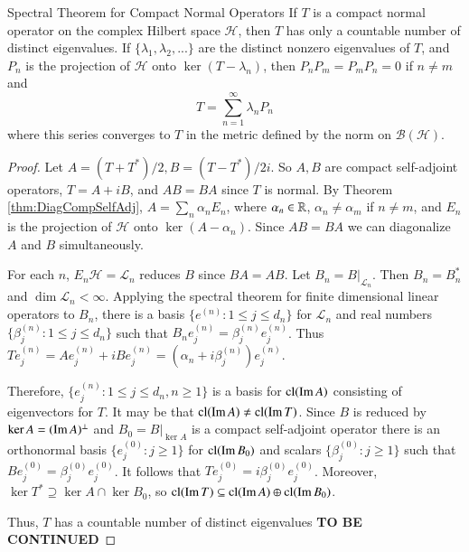 \begin{nthm}{Spectral Theorem for Compact Normal Operators}\label{thm:specComp}
    If $T$ is a compact normal operator on the complex Hilbert space $\mathscr{H}$, then $T$ has only a countable number of distinct eigenvalues. If $\{\lambda_1,\lambda_2,...\}$ are the distinct nonzero eigenvalues of $T$, and $P_n$ is the projection of $\mathscr{H}$ onto $\ker(T-\lambda_n)$, then $P_nP_m = P_mP_n = 0$ if $n \neq m$ and \begin{equation}
        T = \sum_{n=1}^{\infty}\lambda_nP_n
    \end{equation}
    where this series converges to $T$ in the metric defined by the norm on $\mathscr{B}(\mathscr{H})$.
\end{nthm}
\begin{proof}
    Let $A = (T+T^*)/2, B = (T-T^*)/2i$. So $A,B$ are compact self-adjoint operators, $T = A+iB$, and $AB=BA$ since $T$ is normal. By Theorem \ref{thm:DiagCompSelfAdj}, $A = \sum_n\alpha_nE_n$, where $\alpha_n \in \mathbb R$, $\alpha_n \neq \alpha_m$ if $n \neq m$, and $E_n$ is the projection of $\mathscr{H}$ onto $\ker(A-\alpha_n)$. Since $AB = BA$ we can diagonalize $A$ and $B$ simultaneously. 

    For each $n$, $E_n\mathscr{H} = \mathcal{L}_n$ reduces $B$ since $BA = AB$. Let $B_n = B\vert_{\mathcal{L}_n}$. Then $B_n = B_n^*$ and $\dim \mathcal{L}_n < \infty$. Applying the spectral theorem for finite dimensional linear operators to $B_n$, there is a basis $\{e^{(n)}:1\leq j\leq d_n\}$ for $\mathcal{L}_n$ and real numbers $\{\beta_j^{(n)}:1\leq j \leq d_n\}$ such that $B_ne^{(n)}_j = \beta_j^{(n)}e_j^{(n)}$. Thus $Te_j^{(n)} = Ae_j^{(n)}+iBe^{(n)}_j = (\alpha_n+i\beta_j^{(n)})e_j^{(n)}$.

    Therefore, $\{e_j^{(n)}:1\leq j \leq d_n,n\geq 1\}$ is a basis for $\text{cl}(\operatorname{Im} A)$ consisting of eigenvectors for $T$. It may be that $\text{cl}(\operatorname{Im} A)\neq \text{cl}(\operatorname{Im} T)$. Since $B$ is reduced by $\ker A = (\operatorname{Im} A)^{\perp}$ and $B_0 = B\vert_{\ker A}$ is a compact self-adjoint operator there is an orthonormal basis $\{e_j^{(0)}:j\geq 1\}$ for $\text{cl}(\operatorname{Im} B_0)$ and scalars $\{\beta_j^{(0)}:j \geq 1\}$ such that $Be_j^{(0)} = \beta_j^{(0)}e_j^{(0)}$. It follows that $Te_j^{(0)} = i\beta_j^{(0)}e_j^{(0)}$. Moreover, $\ker T^* \supseteq \ker A\cap \ker B_0$, so $\text{cl}(\operatorname{Im} T) \subseteq \text{cl}(\operatorname{Im} A)\oplus\text{cl}(\operatorname{Im} B_0)$.

    Thus, $T$ has a countable number of distinct eigenvalues \textbf{TO BE CONTINUED}
\end{proof}

